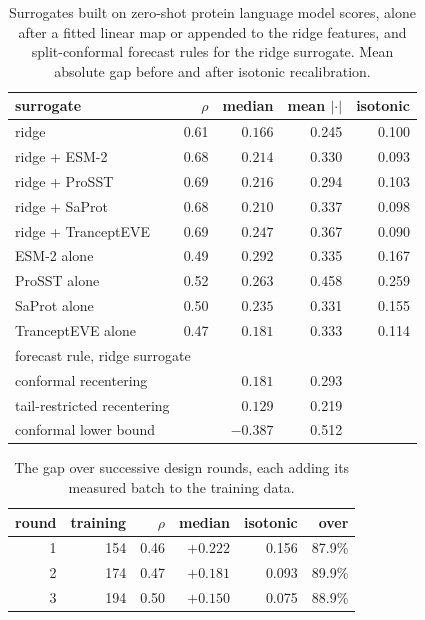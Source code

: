\documentclass{article}
\theoremstyle{plain}
\theoremstyle{definition}
\begin{document}
\begin{table}[ht]
\caption{Surrogates built on zero-shot protein language model scores, alone after a
fitted linear map or appended to the ridge features, and split-conformal forecast rules
for the ridge surrogate. Mean absolute gap before and after isotonic recalibration.}
\label{tab:sota}
\vskip 0.1in
\begin{center}
\begin{small}
\begin{tabular}{lrrrr}
\toprule
surrogate & $\rho$ & median & mean $|\cdot|$ & isotonic \\
\midrule
ridge               & 0.61 & $0.166$ & 0.245 & 0.100 \\
ridge + ESM-2       & 0.68 & $0.214$ & 0.330 & 0.093 \\
ridge + ProSST      & 0.69 & $0.216$ & 0.294 & 0.103 \\
ridge + SaProt      & 0.68 & $0.210$ & 0.337 & 0.098 \\
ridge + TranceptEVE & 0.69 & $0.247$ & 0.367 & 0.090 \\
ESM-2 alone         & 0.49 & $0.292$ & 0.335 & 0.167 \\
ProSST alone        & 0.52 & $0.263$ & 0.458 & 0.259 \\
SaProt alone        & 0.50 & $0.235$ & 0.331 & 0.155 \\
TranceptEVE alone   & 0.47 & $0.181$ & 0.333 & 0.114 \\
\midrule
\multicolumn{5}{l}{forecast rule, ridge surrogate} \\
conformal recentering   & & $0.181$ & 0.293 & \\
tail-restricted recentering & & $0.129$ & 0.219 & \\
conformal lower bound   & & $-0.387$ & 0.512 & \\
\bottomrule
\end{tabular}
\end{small}
\end{center}
\vskip -0.1in
\end{table}

\begin{table}[ht]
\caption{The gap over successive design rounds, each adding its measured batch to the
training data.}
\label{tab:rounds}
\vskip 0.1in
\begin{center}
\begin{small}
\begin{tabular}{rrrrrr}
\toprule
round & training & $\rho$ & median & isotonic & over \\
\midrule
1 & 154 & 0.46 & $+0.222$ & 0.156 & 87.9\% \\
2 & 174 & 0.47 & $+0.181$ & 0.093 & 89.9\% \\
3 & 194 & 0.50 & $+0.150$ & 0.075 & 88.9\% \\
\bottomrule
\end{tabular}
\end{small}
\end{center}
\vskip -0.1in
\end{table}
\end{document}
